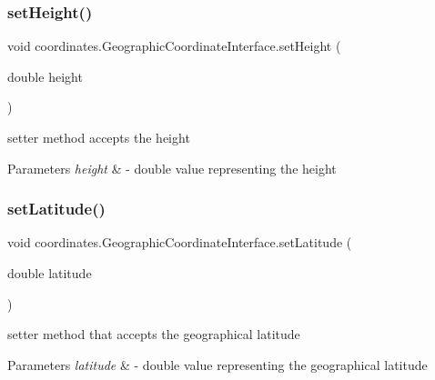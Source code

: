 \subsubsection{\texorpdfstring{set\+Height()}{setHeight()}}
{\footnotesize\ttfamily void coordinates.\+Geographic\+Coordinate\+Interface.\+set\+Height (\begin{DoxyParamCaption}\item[{double}]{height }\end{DoxyParamCaption})}



setter method accepts the height 


\begin{DoxyParams}{Parameters}
{\em height} & -\/ double value representing the height \\
\hline
\end{DoxyParams}
\mbox{\label{classcoordinates_1_1_geographic_coordinate_interface_ab10e03a921d5c7e821dda05d258628db}} 
\subsubsection{\texorpdfstring{set\+Latitude()}{setLatitude()}}
{\footnotesize\ttfamily void coordinates.\+Geographic\+Coordinate\+Interface.\+set\+Latitude (\begin{DoxyParamCaption}\item[{double}]{latitude }\end{DoxyParamCaption})}



setter method that accepts the geographical latitude 


\begin{DoxyParams}{Parameters}
{\em latitude} & -\/ double value representing the geographical latitude \\
\hline
\end{DoxyParams}
\mbox{\label{classcoordinates_1_1_geographic_coordinate_interface_a37768130dfa4697eebbb93dbb639b78c}} 
